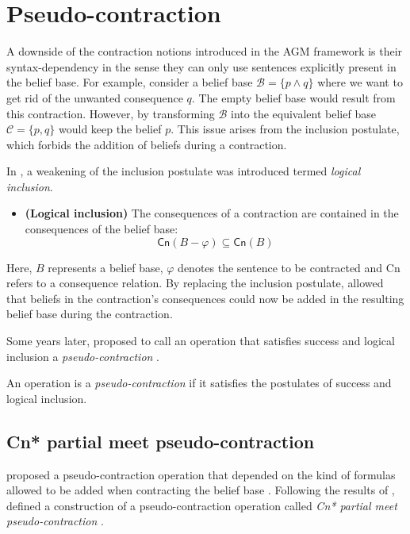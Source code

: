 \section{Pseudo-contraction}

A downside of the contraction notions introduced in the AGM framework \citep{AGM1985} is their syntax-dependency in the sense they can only use sentences explicitly present in the belief base. For example, consider a belief base $\mathcal{B} = \{ p \wedge q \}$ where we want to get rid of the unwanted consequence $q$. The empty belief base would result from this contraction. However, by transforming $\mathcal{B}$ into the equivalent belief base $\mathcal{C} = \{ p, q \}$ would keep the belief $p$. This issue arises from the inclusion postulate, which forbids the addition of beliefs during a contraction. 

In \citet{Hansson1989}, a weakening of the inclusion postulate was introduced termed \textit{logical inclusion}.

\begin{itemize}
    \item[] \textbf{(Logical inclusion)} The consequences of a contraction are contained in the consequences of the belief base:
    $$\textsf{Cn}(B - \varphi) \subseteq \textsf{Cn}(B)$$
\end{itemize}

Here, $B$ represents a belief base, $\varphi$ denotes the sentence to be contracted and \textsf{Cn} refers to a consequence relation. By replacing the inclusion postulate, \citeauthor{Hansson1989} allowed that beliefs in the contraction's consequences could now be added in the resulting belief base during the contraction.

Some years later, \citeauthor{Hansson1993a} proposed to call an operation that satisfies success and logical inclusion a \textit{pseudo-contraction} \citep{Hansson1993a}.

\begin{definition}
    An operation is a \textit{pseudo-contraction} if it satisfies the postulates of success and logical inclusion.
\end{definition}

\subsection{\textsf{Cn*} partial meet pseudo-contraction}

\citeauthor{Santos2016} proposed a pseudo-contraction operation that depended on the kind of formulas allowed to be added when contracting the belief base \citep{Santos2016,Santos2018}. Following the results of \citet{Hansson1993a}, \citeauthor{Santos2016} defined a construction of a pseudo-contraction operation called \textit{\textsf{Cn*} partial meet pseudo-contraction} \citep{Santos2016}.

